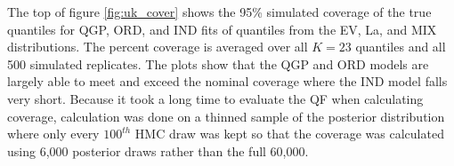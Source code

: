 




The top of figure \ref{fig:uk_cover} shows the 95\% simulated coverage of the 
true quantiles 
for QGP, ORD, and IND fits of quantiles from the EV, La, and MIX distributions. 
The percent coverage is 
averaged over all $K = 23$ quantiles and all 500 simulated replicates.  
The plots show that the QGP and ORD models are largely able to meet and exceed 
the nominal coverage where the IND model falls very short. Because it took a 
long time to evaluate the QF when calculating coverage, calculation was done on 
a thinned sample of the posterior distribution where only every $100^{th}$ HMC 
draw was kept so that the coverage was calculated using 6,000 posterior draws 
rather than the full 60,000.

